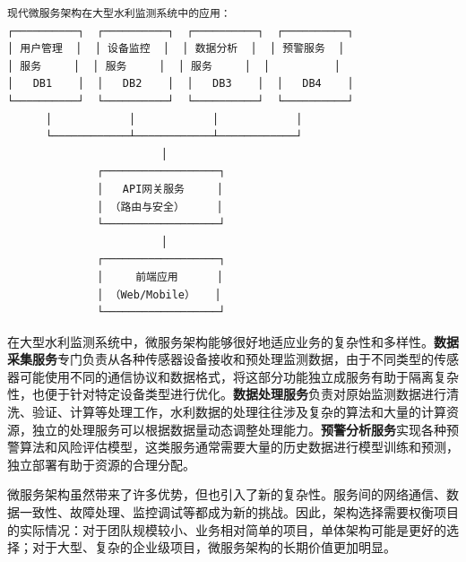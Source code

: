 \begin{lstlisting}
现代微服务架构在大型水利监测系统中的应用：
┌──────────┐  ┌──────────┐  ┌──────────┐  ┌──────────┐
│ 用户管理  │  │ 设备监控  │  │ 数据分析  │  │ 预警服务  │
│ 服务     │  │ 服务     │  │ 服务     │  │          │
│   DB1    │  │   DB2    │  │   DB3    │  │   DB4    │
└──────────┘  └──────────┘  └──────────┘  └──────────┘
      │            │            │            │
      └────────────┴────────────┴────────────┘
                        │
              ┌──────────────────┐
              │   API网关服务     │
              │ （路由与安全）     │
              └──────────────────┘
                        │
              ┌──────────────────┐
              │     前端应用      │
              │ （Web/Mobile）   │
              └──────────────────┘
\end{lstlisting}

在大型水利监测系统中，微服务架构能够很好地适应业务的复杂性和多样性。\textbf{数据采集服务}专门负责从各种传感器设备接收和预处理监测数据，由于不同类型的传感器可能使用不同的通信协议和数据格式，将这部分功能独立成服务有助于隔离复杂性，也便于针对特定设备类型进行优化。\textbf{数据处理服务}负责对原始监测数据进行清洗、验证、计算等处理工作，水利数据的处理往往涉及复杂的算法和大量的计算资源，独立的处理服务可以根据数据量动态调整处理能力。\textbf{预警分析服务}实现各种预警算法和风险评估模型，这类服务通常需要大量的历史数据进行模型训练和预测，独立部署有助于资源的合理分配。

微服务架构虽然带来了许多优势，但也引入了新的复杂性。服务间的网络通信、数据一致性、故障处理、监控调试等都成为新的挑战。因此，架构选择需要权衡项目的实际情况：对于团队规模较小、业务相对简单的项目，单体架构可能是更好的选择；对于大型、复杂的企业级项目，微服务架构的长期价值更加明显。

